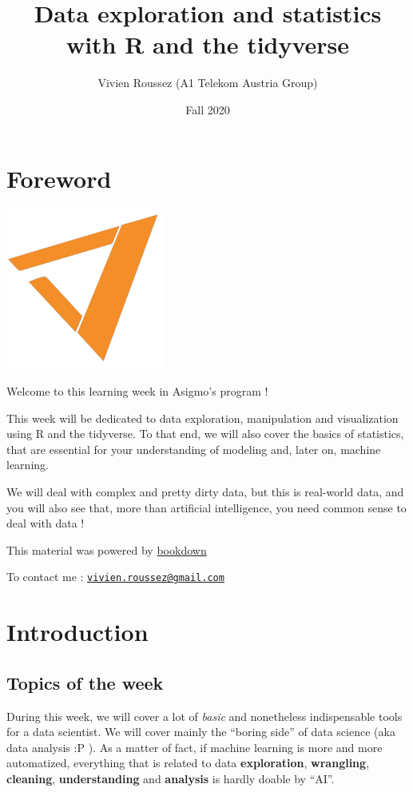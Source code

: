 \documentclass[
]{book}
\title{Data exploration and statistics with R and the tidyverse}
\author{Vivien Roussez (A1 Telekom Austria Group)}
\date{Fall 2020}
\begin{document}
\maketitle

{
\setcounter{tocdepth}{1}
\tableofcontents
}
\hypertarget{foreword}{%
\chapter{Foreword}\label{foreword}}

\includegraphics{img/asigmo.png}

Welcome to this learning week in Asigmo's program !

This week will be dedicated to data exploration, manipulation and visualization using R and the tidyverse. To that end, we will also cover the basics of statistics, that are essential for your understanding of modeling and, later on, machine learning.

We will deal with complex and pretty dirty data, but this is real-world data, and you will also see that, more than artificial intelligence, you need common sense to deal with data !

This material was powered by \href{https://bookdown.org/home/}{bookdown}

To contact me : \href{mailto:vivien.roussez@gmail.com}{\nolinkurl{vivien.roussez@gmail.com}}

\hypertarget{intro}{%
\chapter{Introduction}\label{intro}}

\hypertarget{topics-of-the-week}{%
\section{Topics of the week}\label{topics-of-the-week}}

During this week, we will cover a lot of \emph{basic} and nonetheless indispensable tools for a data scientist. We will cover mainly the ``boring side'' of data science (aka data analysis :P ). As a matter of fact, if machine learning is more and more automatized, everything that is related to data \textbf{exploration}, \textbf{wrangling}, \textbf{cleaning}, \textbf{understanding} and \textbf{analysis} is hardly doable by ``AI''.
\end{document}
